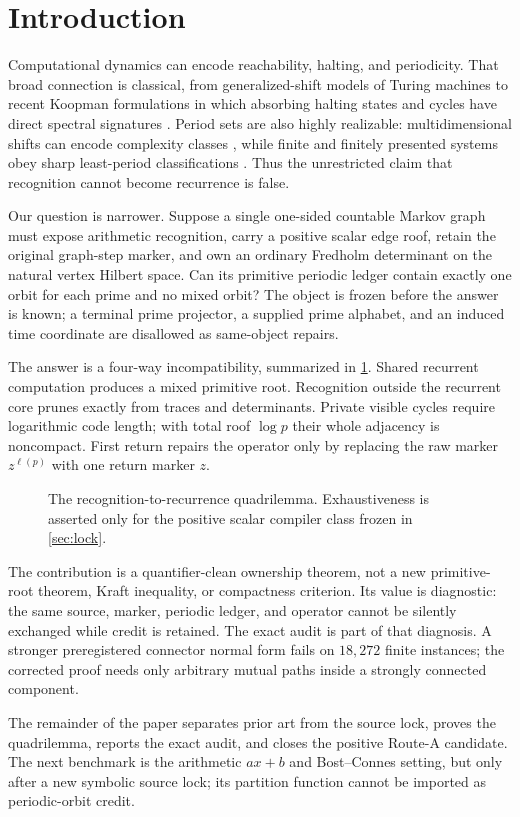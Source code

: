 \section{Introduction}

Computational dynamics can encode reachability, halting, and periodicity.
That broad connection is classical, from generalized-shift models of Turing
machines \citep{Kurka1997,DelvenneKurkaBlondel2006} to recent Koopman
formulations in which absorbing halting states and cycles have direct spectral
signatures \citep{CaravelliDelvenne2026}.  Period sets are also highly
realizable: multidimensional shifts can encode complexity classes
\citep{JeandelVanier2015}, while finite and finitely presented systems obey
sharp least-period classifications \citep{DoeringPavlov2019,deJong2026}.
Thus the unrestricted claim that recognition cannot become recurrence is
false.

Our question is narrower.  Suppose a single one-sided countable Markov graph
must expose arithmetic recognition, carry a positive scalar edge roof, retain
the original graph-step marker, and own an ordinary Fredholm determinant on
the natural vertex Hilbert space.  Can its primitive periodic ledger contain
exactly one orbit for each prime and no mixed orbit?  The object is frozen
before the answer is known; a terminal prime projector, a supplied prime
alphabet, and an induced time coordinate are disallowed as same-object
repairs.

The answer is a four-way incompatibility, summarized in \cref{fig:quad}.
Shared recurrent computation produces a mixed primitive root.  Recognition
outside the recurrent core prunes exactly from traces and determinants.
Private visible cycles require logarithmic code length; with total roof
$\log p$ their whole adjacency is noncompact.  First return repairs the
operator only by replacing the raw marker $z^{\ell(p)}$ with one return marker
$z$.

\begin{figure}[t]
\centering

\caption{The recognition-to-recurrence quadrilemma.  Exhaustiveness is asserted
only for the positive scalar compiler class frozen in \cref{sec:lock}.}
\label{fig:quad}
\end{figure}

The contribution is a quantifier-clean ownership theorem, not a new
primitive-root theorem, Kraft inequality, or compactness criterion.  Its
value is diagnostic: the same source, marker, periodic ledger, and operator
cannot be silently exchanged while credit is retained.  The exact audit is
part of that diagnosis.  A stronger preregistered connector normal form fails
on $18{,}272$ finite instances; the corrected proof needs only arbitrary
mutual paths inside a strongly connected component.

The remainder of the paper separates prior art from the source lock,
proves the quadrilemma, reports the exact audit, and closes the positive
Route-A candidate.  The next benchmark is the arithmetic $ax+b$ and
Bost--Connes setting, but only after a new symbolic source lock; its partition
function cannot be imported as periodic-orbit credit.

